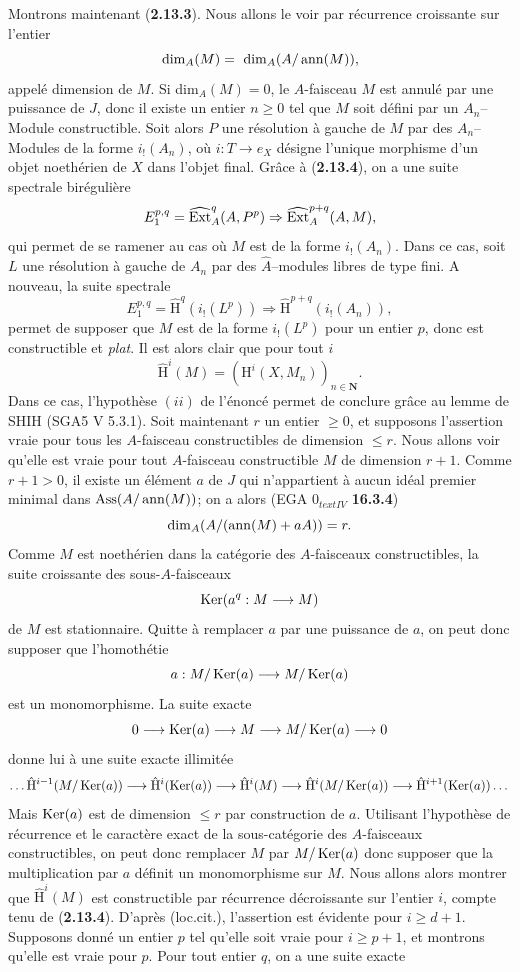 Montrons maintenant ({\bf 2.13.3}). Nous allons le voir par récurrence croissante sur l'entier
$$
\text{dim}_A(M) =~\operatorname{dim}_A(A/\operatorname{ann}(M)), 
$$
appelé dimension de $M$. Si dim$_A(M) = 0$, le $A$-faisceau $M$ est annulé par une puissance de $J$, donc il existe un entier $n \geq 0$ tel que $M$ soit défini par un $A_n$--Module constructible. Soit alors $P$ une résolution à gauche de $M$ par des $A_n$--Modules de la forme $i_!(A_n)$, où $i: T \to e_X$ désigne l'unique morphisme d'un objet noethérien de $X$ dans l'objet final. Grâce à ({\bf 2.13.4}), on a une suite spectrale birégulière
$$
E^{p, q}_1 = \widehat{\operatorname{Ext}}^q_A(A, P^p) \Rightarrow \widehat{\operatorname{Ext}}^{p+q}_A(A, M),
$$
qui permet de se ramener au cas où $M$ est de la forme $i_!(A_n)$. Dans ce cas, soit $L$ une résolution à gauche de $A_n$ par des $\hat{A}$--modules libres de type fini. A nouveau, la suite spectrale
$$
E^{p, q}_1 = \hat{\mathrm{H}}^q(i_!(L^p)) \Rightarrow \hat{\mathrm{H}}^{p+q}(i_!(A_n)),
$$
permet de supposer que $M$ est de la forme $i_!(L^p)$ pour un entier $p$, donc est constructible et \emph{plat}. Il est alors clair que pour tout $i$
$$
\hat{\mathrm{H}}^i(M) = (\mathrm{H}^i(X, M_n))_{n \in \mathbf{N}}.
$$
Dans ce cas, l'hypothèse $(ii)$ de l'énoncé permet de conclure grâce au lemme de SHIH (SGA5 V 5.3.1). Soit maintenant $r$ un entier $\geq 0$, et supposons l'assertion vraie pour tous les $A$-faisceau constructibles de dimension $\leq r$. Nous allons voir qu'elle est vraie pour tout $A$-faisceau constructible $M$ de dimension $r+1$. Comme $r+1 > 0$, il existe un élément $a$ de $J$ qui n'appartient à aucun idéal premier minimal dans $\operatorname{Ass}(A/\operatorname{ann}(M))$; on a alors (EGA $0_{text{IV}}$ {\bf 16.3.4})
$$
\operatorname{dim}_A(A/(\operatorname{ann}(M) + aA)) = r.
$$
Comme $M$ est noethérien dans la catégorie des $A$-faisceaux constructibles, la suite croissante des sous-$A$-faisceaux
$$
\operatorname{Ker}(a^q: M \longrightarrow M)
$$
de $M$ est stationnaire. Quitte à remplacer $a$ par une puissance de $a$, on peut donc supposer que l'homothétie
$$
a: M/\operatorname{Ker}(a) \longrightarrow M/\operatorname{Ker}(a)
$$
est un monomorphisme. La suite exacte
$$
0 \longrightarrow \operatorname{Ker}(a) \longrightarrow M \longrightarrow M/\operatorname{Ker}(a) \longrightarrow 0
$$
donne lui à une suite exacte illimitée
$$
\dots \hat{\mathrm{H}}^{i-1}(M/\operatorname{Ker}(a)) \longrightarrow \hat{\mathrm{H}}^i(\operatorname{Ker}(a)) \longrightarrow \hat{\mathrm{H}}^i(M) \longrightarrow \hat{\mathrm{H}}^i(M/\operatorname{Ker}(a)) \longrightarrow \hat{\mathrm{H}}^{i+1}(\operatorname{Ker}(a)) \dots 
$$
Mais $\operatorname{Ker}(a)$ est de dimension $\leq r$ par construction de $a$. Utilisant l'hypothèse de récurrence et le caractère exact de la sous-catégorie des $A$-faisceaux constructibles, on peut donc remplacer $M$ par $M/\operatorname{Ker}(a)$ donc supposer que la multiplication par $a$ définit un monomorphisme sur $M$. Nous allons alors montrer que $\hat{\mathrm{H}}^i(M)$ est constructible par récurrence décroissante sur l'entier $i$, compte tenu de ({\bf 2.13.4}). D'après (loc.cit.), l'assertion est évidente pour $i \geq d+1$. Supposons donné un entier $p$ tel qu'elle soit vraie pour $i \geq p+1$, et montrons qu'elle est vraie pour $p$. Pour tout entier $q$, on a une suite exacte
